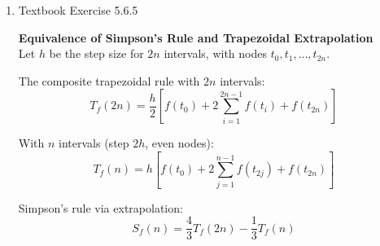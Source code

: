 \documentclass[reqno, answers]{exam}
\begin{document}
\begin{enumerate}
\begin{solution}
              \vspace{1em}
              \noindent \textbf{(c) Local Simpson's Rule} \\
              Using $s = x - t_i$, we map $[t_{i-1}, t_{i+1}]$ to $[-h, h]$. With $\alpha = f(t_{i-1})$, $\beta = f(t_i)$, and $\gamma = f(t_{i+1})$:
              \begin{align*}
                  \int_{t_{i-1}}^{t_{i+1}} f(x) \, dx \approx \frac{h}{3}[f(t_{i-1}) + 4f(t_i) + f(t_{i+1})]
              \end{align*}

              \vspace{1em}
              \noindent \textbf{(d) Composite Simpson's Rule} \\
              Summing over $m$ subintervals where $n=2m$:
              \begin{align*}
                  \int_{a}^{b} f(x) \, dx & = \sum_{j=1}^{m} \int_{t_{2j-2}}^{t_{2j}} f(x) \, dx                                \\
                                          & \approx \sum_{j=1}^{m} \frac{h}{3} [f(t_{2j-2}) + 4f(t_{2j-1}) + f(t_{2j})]         \\
                                          & = \frac{h}{3} [f(t_0) + 4f(t_1) + 2f(t_2) + 4f(t_3) + \dots + 4f(t_{n-1}) + f(t_n)]
              \end{align*}

          \end{solution}

    \item Textbook Exercise 5.6.5

          \begin{solution}
              \noindent \textbf{Equivalence of Simpson's Rule and Trapezoidal Extrapolation} \\

              Let $h$ be the step size for $2n$ intervals, with nodes $t_0, t_1, \dots, t_{2n}$.

              The composite trapezoidal rule with $2n$ intervals:
              \[
                  T_f(2n) = \frac{h}{2} \left[ f(t_0) + 2\sum_{i=1}^{2n-1} f(t_i) + f(t_{2n}) \right]
              \]

              With $n$ intervals (step $2h$, even nodes):
              \[
                  T_f(n) = h \left[ f(t_0) + 2\sum_{j=1}^{n-1} f(t_{2j}) + f(t_{2n}) \right]
              \]

              Simpson's rule via extrapolation:
              \[
                  S_f(n) = \frac{4}{3}T_f(2n) - \frac{1}{3}T_f(n)
              \]


\end{solution}
\end{enumerate}
\end{document}
